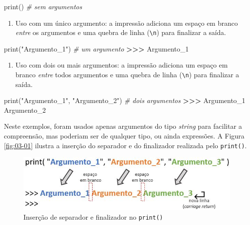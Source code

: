 \documentclass[
]{book}
\newenvironment{Shaded}{\begin{snugshade}}{\end{snugshade}}
\newcommand{\BuiltInTok}[1]{#1}
\newcommand{\CommentTok}[1]{\textcolor[rgb]{0.56,0.35,0.01}{\textit{#1}}}
\newcommand{\NormalTok}[1]{#1}
\newcommand{\OperatorTok}[1]{\textcolor[rgb]{0.81,0.36,0.00}{\textbf{#1}}}
\newcommand{\StringTok}[1]{\textcolor[rgb]{0.31,0.60,0.02}{#1}}
\providecommand{\tightlist}{%
  \setlength{\itemsep}{0pt}\setlength{\parskip}{0pt}}
\begin{document}
\begin{Shaded}
\begin{Highlighting}[]
\BuiltInTok{print}\NormalTok{() }\CommentTok{\# sem argumentos}
\end{Highlighting}
\end{Shaded}

\begin{enumerate}
\def\labelenumi{\arabic{enumi}.}
\setcounter{enumi}{1}
\tightlist
\item
  Uso com um único argumento: a impressão adiciona um espaço em branco \emph{entre} os argumentos e uma quebra de linha (\texttt{\textbackslash{}n}) para finalizar a saída.
\end{enumerate}

\begin{Shaded}
\begin{Highlighting}[]
\BuiltInTok{print}\NormalTok{(}\StringTok{"Argumento\_1"}\NormalTok{) }\CommentTok{\# um argumento}
\OperatorTok{\textgreater{}\textgreater{}\textgreater{}}\NormalTok{ Argumento\_1}
\end{Highlighting}
\end{Shaded}

\begin{enumerate}
\def\labelenumi{\arabic{enumi}.}
\setcounter{enumi}{2}
\tightlist
\item
  Uso com dois ou mais argumentos: a impressão adiciona um espaço em branco \emph{entre} todos argumentos e uma quebra de linha (\texttt{\textbackslash{}n}) para finalizar a saída.
\end{enumerate}

\begin{Shaded}
\begin{Highlighting}[]
\BuiltInTok{print}\NormalTok{(}\StringTok{"Argumento\_1"}\NormalTok{, }\StringTok{"Argumento\_2"}\NormalTok{) }\CommentTok{\# dois argumentos}
\OperatorTok{\textgreater{}\textgreater{}\textgreater{}}\NormalTok{ Argumento\_1 Argumento\_2}
\end{Highlighting}
\end{Shaded}

Neste exemplos, foram usados apenas argumentos do tipo \emph{string} para facilitar a compreensão, mas poderiam ser de qualquer tipo, ou ainda expressões. A Figura \ref{fig:03-01} ilustra a inserção do separador e do finalizador realizada pelo \texttt{print()}.

\begin{figure}
\centering
\includegraphics{images/03-02.jpg}
\caption{\label{fig:03-02}Inserção de separador e finalizador no \texttt{print()}}
\end{figure}
\end{document}
